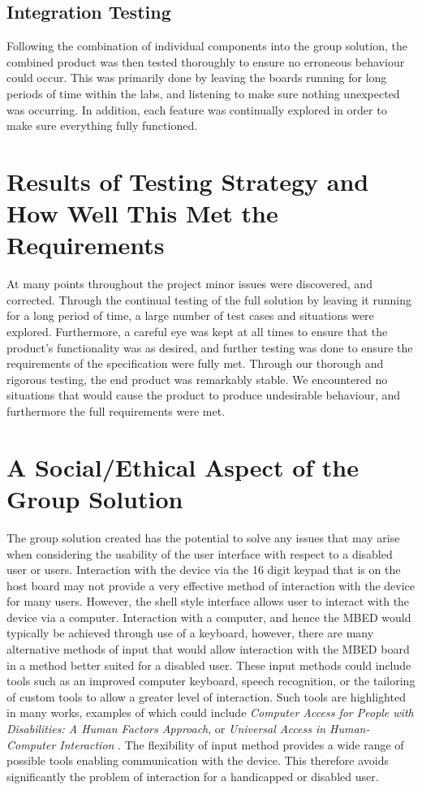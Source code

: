 \subsection*{Integration Testing}

Following the combination of individual components into the group solution, the 
combined product was then tested thoroughly to ensure no erroneous behaviour 
could occur. This was primarily done by leaving the boards running for long 
periods of time within the labs, and listening to make sure nothing unexpected 
was occurring. In addition, each feature was continually explored in order to 
make sure everything fully functioned.  

\section{Results of Testing Strategy and How Well This Met the Requirements}

At many points throughout the project minor issues were discovered, and corrected. 
Through the continual testing of the full solution by leaving it running for a 
long period of time, a large number of test cases and situations were explored.
Furthermore, a careful eye was kept at all times to ensure that the product's
functionality was as desired, and further testing was done to ensure the 
requirements of the specification were fully met.
Through our thorough and rigorous testing, the end product was remarkably stable. 
We encountered no situations that would cause the product to produce undesirable 
behaviour, and furthermore the full requirements were met.

\section{A Social/Ethical Aspect of the Group Solution} 

The group solution created has the potential to solve any issues that may arise 
when considering the usability of the user interface with respect to a disabled 
user or users. Interaction with the device via the 16 digit keypad that is on 
the host board may not provide a very effective method of interaction with the 
device for many users. However, the shell style interface allows user to interact 
with the device via a computer. Interaction with a computer, and hence the MBED 
would typically be achieved through use of a keyboard, however, there are many 
alternative methods of input that would allow interaction with the MBED board in 
a method better suited for a disabled user. These input methods could include 
tools such as an improved computer keyboard, speech recognition, or the tailoring 
of custom tools to allow a greater level of interaction. Such tools are 
highlighted in many works, examples of which could include \textit{Computer Access for People with 
Disabilities: A Human Factors Approach}, or \textit{Universal Access in 
Human-Computer Interaction} \cite{disabled-book, disabled-book2}. The flexibility of 
input method provides a wide range of possible tools enabling communication with 
the device. This therefore avoids significantly the problem of interaction for 
a handicapped or disabled user. 
